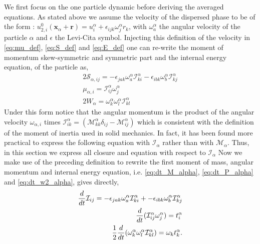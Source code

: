 We first focus on the one particle dynamic before deriving the averaged equations. 
As stated above we assume the velocity of the dispersed phase to be of the form : $u_{2,i}^0(\textbf{x}_\alpha + \textbf{r}) = u_{i}^\alpha + \epsilon_{ijk} {\omega}_{j}^\alpha {r}_k$, with $\omega_{a}^\alpha$ the angular velocity of the particle $\alpha$ and $\epsilon$ the Levi-Cita symbol.
Injecting this definition of the velocity in \ref{eq:mu_def}, \ref{eq:S_def} and \ref{eq:E_def} one can re-write the moment of momentum skew-symmetric and symmetric part and the internal energy equation, of the particle as,
\begin{align}
    2\mathcal{S}_{\alpha,ij}
    = - \epsilon_{jak} \omega_a^\alpha \mathcal{I}_{ki}^\alpha
      - \epsilon_{ibk} \omega_b^\alpha \mathcal{I}_{kj}^\alpha
    \\
    \mu_{\alpha,i}
    =  \mathcal{I}_{ij}^\alpha \omega^\alpha_j\\
    2W_\alpha 
    = \omega^\alpha_k\omega^\alpha_l \mathcal{I}_{kl}^\alpha
\end{align}
Under this form notice that the angular momentum is the product of the angular velocity $\omega_{\alpha,i}$ times $\mathcal{I}_{ik}^\alpha = (\mathcal{M}_{kk}^\alpha \delta_{ij} - \mathcal{M}_{ij}^\alpha)$ which is consistent with the definition of the moment of inertia used in solid mechanics.
In fact, it has been found  more practical to express the following equation with $\mathcal{I}_\alpha$ rather than with $\mathcal{M}_\alpha$. 
Thus, in this section we express all closure and equation with respect to $\mathcal{I}_\alpha$
Now we make use of the preceding definition to rewrite the first moment of mass, angular momentum and internal energy equation, i.e. \ref{eq:dt_M_alpha}, \ref{eq:dt_P_alpha} and \ref{eq:dt_w2_alpha}, gives directly, 
\begin{align}
    \label{eq:dt_I_alpha}
    \frac{d}{dt} \mathcal{I}_{ij}
    = - \epsilon_{jak} \omega_a^\alpha \mathcal{I}_{ki}^\alpha + 
    - \epsilon_{ibk}   \omega_b^\alpha \mathcal{I}_{kj}^\alpha\\
    \label{eq:dt_Iomega_alpha}
    \frac{d}{dt} (\mathcal{I}_{ij}^\alpha \omega_j^\alpha)
    = t^\alpha_i\\
    \label{eq:dt_Iomegaomega_alpha}
    \frac{1}{2}\frac{d}{dt} (\omega^\alpha_k\omega^\alpha_l \mathcal{I}_{kl}^\alpha)
    = \omega_k t^\alpha_k. 
\end{align}
